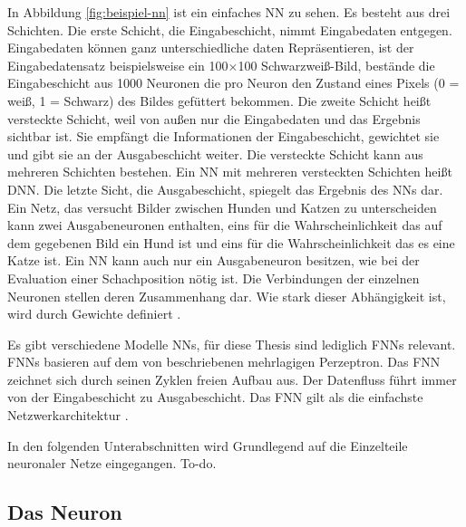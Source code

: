 In Abbildung \autoref{fig:beispiel-nn} ist ein einfaches \acl{NN} zu sehen. Es besteht aus drei Schichten. Die erste Schicht, die Eingabeschicht, nimmt Eingabedaten entgegen. Eingabedaten können ganz unterschiedliche daten Repräsentieren, ist der Eingabedatensatz beispielsweise ein 100×100 Schwarzweiß-Bild, bestände die Eingabeschicht aus 1000 Neuronen die pro Neuron den Zustand eines Pixels (0 = weiß, 1 = Schwarz) des Bildes gefüttert bekommen. Die zweite Schicht heißt versteckte Schicht, weil von außen nur die Eingabedaten und das Ergebnis sichtbar ist. Sie empfängt die Informationen der Eingabeschicht, gewichtet sie und gibt sie an der Ausgabeschicht weiter. Die versteckte Schicht kann aus mehreren Schichten bestehen. Ein \ac{NN} mit mehreren versteckten Schichten heißt \ac{DNN}. Die letzte Sicht, die Ausgabeschicht, spiegelt das Ergebnis des \acp{NN} dar. Ein Netz, das versucht Bilder zwischen Hunden und Katzen zu unterscheiden kann zwei Ausgabeneuronen enthalten, eins für die Wahrscheinlichkeit das auf dem gegebenen Bild ein Hund ist und eins für die Wahrscheinlichkeit das es eine Katze ist. Ein \ac{NN} kann auch nur ein Ausgabeneuron besitzen, wie \zb{} bei der Evaluation einer Schachposition nötig ist. Die Verbindungen der einzelnen Neuronen stellen deren Zusammenhang dar. Wie stark dieser Abhängigkeit ist, wird durch Gewichte definiert \cite[S. 2--7]{krawczak2013multilayer}.

Es gibt verschiedene Modelle \aclp{NN}, für diese Thesis sind lediglich \acp{FNN} relevant. \acp{FNN} basieren auf dem von \citeauthor{rosenblatt1958perceptron} \cite{rosenblatt1958perceptron} beschriebenen mehrlagigen Perzeptron. Das \ac{FNN} zeichnet sich durch seinen Zyklen freien Aufbau aus. Der Datenfluss führt immer von der Eingabeschicht zu Ausgabeschicht. Das \ac{FNN} gilt als die einfachste Netzwerkarchitektur \cite{Schmidhuber2015}.

In den folgenden Unterabschnitten wird Grundlegend auf die Einzelteile neuronaler Netze eingegangen. To-do.

\subsection{Das Neuron}

